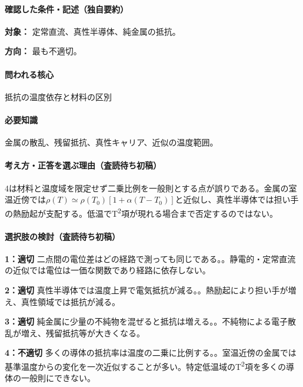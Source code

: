 \paragraph{確認した条件・記述（独自要約）}\mbox{}\par

\noindent\textbf{対象：} 定常直流、真性半導体、純金属の抵抗。\par

\noindent\textbf{方向：} 最も不適切。\par

\paragraph{問われる核心} 抵抗の温度依存と材料の区別

\paragraph{必要知識} 金属の散乱、残留抵抗、真性キャリア、近似の温度範囲。

\paragraph{考え方・正答を選ぶ理由（査読待ち初稿）} 4は材料と温度域を限定せず二乗比例を一般則とする点が誤りである。金属の室温近傍では\(\rho(T)\simeq\rho(T_0)[1+\alpha(T-T_0)]\)と近似し、真性半導体では担い手の熱励起が支配する。低温でT\textsuperscript{2}項が現れる場合まで否定するのではない。

\paragraph{選択肢の検討（査読待ち初稿）}\mbox{}\par

\noindent\textbf{1：適切} 二点間の電位差はどの経路で測っても同じである。。静電的・定常直流の近似では電位は一価な関数であり経路に依存しない。\par

\noindent\textbf{2：適切} 真性半導体では温度上昇で電気抵抗が減る。。熱励起により担い手が増え、真性領域では抵抗が減る。\par

\noindent\textbf{3：適切} 純金属に少量の不純物を混ぜると抵抗は増える。。不純物による電子散乱が増え、残留抵抗等が大きくなる。\par

\noindent\textbf{4：不適切} 多くの導体の抵抗率は温度の二乗に比例する。。室温近傍の金属では基準温度からの変化を一次近似することが多い。特定低温域のT\textsuperscript{2}項を多くの導体の一般則にできない。\par

